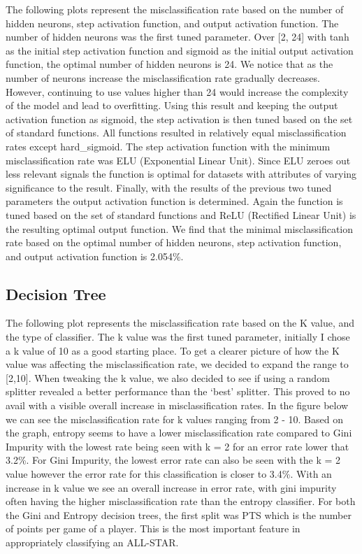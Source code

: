 \documentclass{article}
\begin{document}
The following plots represent the misclassification rate based on the number of hidden neurons, step activation function, and output activation function. The number of hidden neurons was the first tuned parameter. Over [2, 24] with tanh as the initial step activation function and sigmoid as the initial output activation function, the optimal number of hidden neurons is 24. We notice that as the number of neurons increase the misclassification rate gradually decreases. However, continuing to use values higher than 24 would increase the complexity of the model and lead to overfitting. Using this result and keeping the output activation function as sigmoid, the step activation is then tuned based on the set of standard functions. All functions resulted in relatively equal misclassification rates except hard\_sigmoid. The step activation function with the minimum misclassification rate was ELU (Exponential Linear Unit). Since ELU zeroes out less relevant signals the function is optimal for datasets with attributes of varying significance to the result. Finally, with the results of the previous two tuned parameters the output activation function is determined. Again the function is tuned based on the set of standard functions and ReLU (Rectified Linear Unit) is the resulting optimal output function. We find that the minimal misclassification rate based on the optimal number of hidden neurons, step activation function, and output activation function is 2.054\%.

\subsection{Decision Tree}
The following plot represents the misclassification rate based on the K value, and the type of classifier. The k value was the first tuned parameter, initially I chose a k value of 10 as a good starting place. To get a clearer picture of how the K value was affecting the misclassification rate, we decided to expand the range to [2,10]. When tweaking the k value, we also decided to see if using a random splitter revealed a better performance than the ‘best’ splitter. This proved to no avail with a visible overall increase in misclassification rates. In the figure below we can see the misclassification rate for k values ranging from 2 - 10. Based on the graph, entropy seems to have a lower misclassification rate compared to Gini Impurity with the lowest rate being seen with k = 2 for an error rate lower that 3.2\%. For Gini Impurity, the lowest error rate can also be seen with the k = 2 value however the error rate for this classification is closer to 3.4\%. With an increase in k value we see an overall increase in error rate, with gini impurity often having the higher misclassification rate than the entropy classifier. For both the Gini and Entropy decision trees, the first split was PTS which is the number of points per game of a player. This is the most important feature in appropriately classifying an ALL-STAR.
\end{document}
